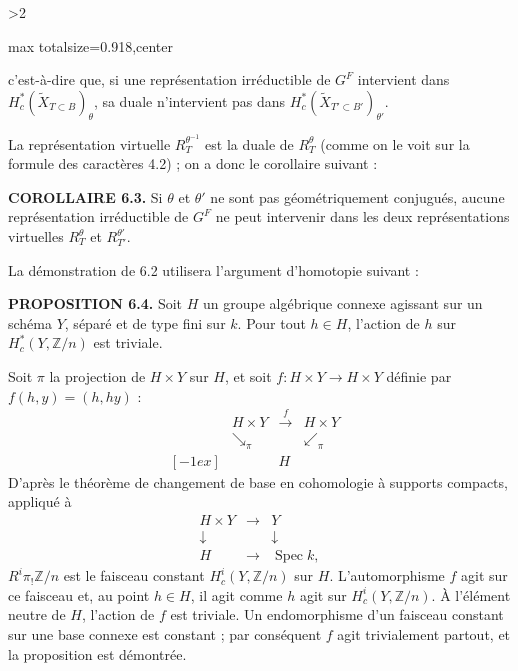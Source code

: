 \documentclass[9pt,twoside]{extarticle}
\newcommand{\EditionPage}[3]{%
  \ifnum#1>2\clearpage\fi
  \pdfbookmark[1]{Printed page #2}{fr-folio-#2}%
  \hypertarget{fr-physical-#1}{}%
  \noindent\begin{adjustbox}{max totalsize={\textwidth}{0.918\textheight},center}
  \begin{minipage}[t]{\textwidth}
  \fontsize{9.4}{11.1}\selectfont\justifying
  #3
  \end{minipage}
  \end{adjustbox}%
}
\begin{document}
\EditionPage{35}{136}{%
c'est-à-dire que, si une représentation irréductible de \(G^F\) intervient dans \(H_c^*(\widetilde X_{T\subset B})_\theta\), sa duale n'intervient pas dans \(H_c^*(\widetilde X_{T'\subset B'})_{\theta'}\).\par

La représentation virtuelle \(R_T^{\theta^{-1}}\) est la duale de \(R_T^\theta\) (comme on le voit sur la formule des caractères 4.2) ; on a donc le corollaire suivant :\par

\noindent\textbf{COROLLAIRE 6.3.} Si \(\theta\) et \(\theta'\) ne sont pas géométriquement conjugués, aucune représentation irréductible de \(G^F\) ne peut intervenir dans les deux représentations virtuelles \(R_T^\theta\) et \(R_{T'}^{\theta'}\).\par

La démonstration de 6.2 utilisera l'argument d'homotopie suivant :\par

\noindent\textbf{PROPOSITION 6.4.} Soit \(H\) un groupe algébrique connexe agissant sur un schéma \(Y\), séparé et de type fini sur \(k\). Pour tout \(h\in H\), l'action de \(h\) sur \(H_c^*(Y,\mathbb Z/n)\) est triviale.\par

Soit \(\pi\) la projection de \(H\times Y\) sur \(H\), et soit \(f:H\times Y\to H\times Y\) définie par \(f(h,y)=(h,hy)\) : \[
\begin{array}{ccccc}
&H\times Y&\xrightarrow{f}&H\times Y&\\
&\searrow_{\pi}&&\swarrow_{\pi}&\\{}[-1ex]
&&H&&
\end{array}
\] D'après le théorème de changement de base en cohomologie à supports compacts, appliqué à \[
\begin{array}{ccc}
H\times Y&\longrightarrow&Y\\
\downarrow&&\downarrow\\
H&\longrightarrow&\operatorname{Spec}k,
\end{array}
\]  \(R^i\pi_!\mathbb Z/n\) est le faisceau constant \(H_c^i(Y,\mathbb Z/n)\) sur \(H\). L'automorphisme \(f\) agit sur ce faisceau et, au point \(h\in H\), il agit comme \(h\) agit sur \(H_c^i(Y,\mathbb Z/n)\). À l'élément neutre de \(H\), l'action de \(f\) est triviale. Un endomorphisme d'un faisceau constant sur une base connexe est constant ; par conséquent \(f\) agit trivialement partout, et la proposition est démontrée.\par

}
\end{document}
